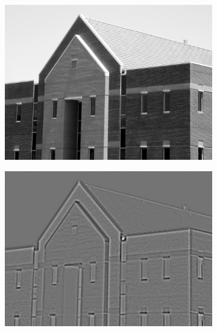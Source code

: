 \begin{figure}[h!]
	\centering
	\begin{subfigure}[b]{0.45\linewidth}
		\includegraphics[width=\linewidth]{myfigure/p9/building.png}
		\caption{}
		\label{fig:marr_building}
	\end{subfigure}
	\begin{subfigure}[b]{0.45\linewidth}
    	\includegraphics[width=\linewidth]{myfigure/p9/9_marrhildreth.png}
    	\caption{}
    	\label{fig:marrhildreth}
  	\end{subfigure}
  	\begin{subfigure}[b]{0.45\linewidth}

\end{subfigure}
\end{figure}
